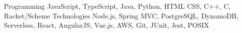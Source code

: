 
\begin{cvskills}
  \cvskill
    {Programming} %
    {
    	    JavaScript,
    	    TypeScript,
        Java,
    	    Python,
   	    HTML CSS,
    	    C++,
    	    C,
    	    Racket/Scheme
    } %
  \cvskill
    {Technologies} %
    {
		Node.js,
		Spring MVC,
		PostgreSQL,
		DynamoDB,
		Serverless,		
		React,
		AngularJS,
		Vue.js, 
		AWS,
 		Git,
		JUnit, 
		Jest,
		POSIX 
    } %

\end{cvskills}
